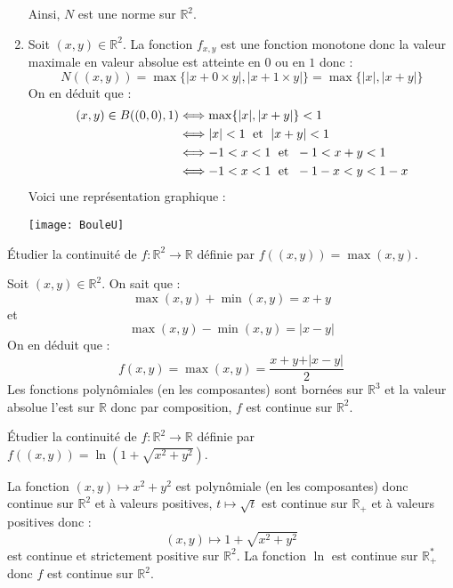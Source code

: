 \documentclass[a4paper,10pt]{report}
\begin{document}
\begin{enumerate}
Ainsi, $N$ est une norme sur $\mathbb{R}^2$.
\item Soit $(x,y) \in \mathbb{R}^2$. La fonction $f_{x,y}$ est une fonction monotone donc la valeur maximale en valeur absolue est atteinte en $0$ ou en $1$ donc :
$$ N((x,y)) = \max \lbrace \vert x+ 0 \times y \vert, \vert x+ 1 \times y \vert \rbrace = \max \lbrace \vert x \vert, \vert x+y \vert \rbrace$$
On en déduit que :
\begin{align*}
(x,y) \in B((0,0),1) & \Longleftrightarrow \max \lbrace \vert x \vert, \vert x+y \vert \rbrace <1 \\
& \Longleftrightarrow \vert x \vert < 1 \; \hbox{ et } \; \vert x+y \vert < 1 \\
& \Longleftrightarrow -1 <x<1 \; \hbox{ et } \;  -1 < x+y<1 \\
& \Longleftrightarrow - 1<x<1 \; \hbox{ et } \; -1-x <y <1-x
\end{align*}
Voici une représentation graphique :

\medskip

\begin{center}
\texttt{[image: BouleU]}
\end{center}
\end{enumerate}

\begin{Exercice}{} Étudier la continuité de $f : \mathbb{R}^2 \rightarrow \mathbb{R}$ définie par $ f((x,y))=  \max(x,y)$.
\end{Exercice}

\corr Soit $(x,y) \in \mathbb{R}^2$. On sait que :
$$ \max(x,y)+ \min(x,y) = x+y$$
et 
$$ \max(x,y)-\min(x,y) = \vert x-y \vert$$
On en déduit que :
$$ f(x,y)= \max(x,y) = \dfrac{x+y+ \vert x-y \vert}{2}$$
Les fonctions polynômiales (en les composantes) sont bornées sur $\mathbb{R}^3$ et la valeur absolue l'est sur $\mathbb{R}$ donc par composition, $f$ est continue sur $\mathbb{R}^2$.

\begin{Exercice}{} Étudier la continuité de $f : \mathbb{R}^2 \rightarrow \mathbb{R}$ définie par $f((x,y))= \ln(1 + \sqrt{x^2+y^2})$.
\end{Exercice}

\corr La fonction $(x,y) \mapsto x^2+y^2$ est polynômiale (en les composantes) donc continue sur $\mathbb{R}^2$ et à valeurs positives, $t \mapsto \sqrt{t}$ est continue sur $\mathbb{R}_+$ et à valeurs positives donc :
$$ (x,y) \mapsto 1+ \sqrt{x^2+y^2}$$
est continue et strictement positive sur $\mathbb{R}^2$. La fonction $\ln$ est continue sur $\mathbb{R}_+^{*}$ donc $f$ est continue sur $\mathbb{R}^2$.
\end{document}
